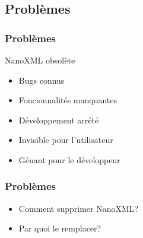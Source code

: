 \subsection{Problèmes}
\begin{frame}\frametitle{Problèmes}
	\begin{beamerboxesrounded}{NanoXML obsolète}
		\begin{itemize}
		\item Bugs connus
		\item Foncionnalités manquantes
		\item Développement arrété
		\end{itemize}
	\end{beamerboxesrounded}
	\begin{itemize}
		\item Invisible pour l'utilisateur
		\item Génant pour le développeur	
	\end{itemize}
\end{frame}
\begin{frame}\frametitle{Problèmes}
\begin{itemize}
	\item Comment supprimer NanoXML?
	\item Par quoi le remplacer?
\end{itemize}
\end{frame}

